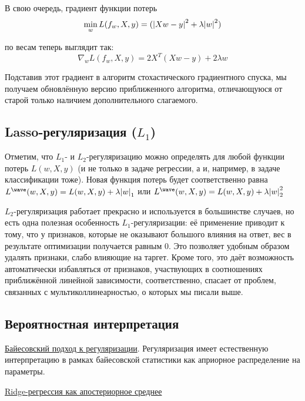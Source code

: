 В свою очередь, градиент функции потерь
\[ \min_w L(f_w,X,y) = (\abs{X w - y }^2 + \lambda \abs{w}^2)\]

по весам теперь выглядит так:
\[ \nabla_w L(f_w,X,y) = 2 X^T (X w - y) + 2 \lambda w \]

Подставив этот градиент в алгоритм стохастического градиентного спуска, мы получаем обновлённую версию приближенного
алгоритма, отличающуюся от старой только наличием дополнительного слагаемого.

\subsection{Lasso-регуляризация ($L_1$)}

Отметим, что $L_1$- и $L_2$-регуляризацию можно определять для любой функции потерь $L(w,X,y)$ (и не только в
задаче регрессии, а и, например, в задаче классификации тоже).
Новая функция потерь будет соответственно равна $L^\wave (w,X,y) = L(w,X,y) + \lambda \abs{w}_1$ или
$L^\wave (w,X,y) = L(w,X,y) + \lambda \abs{w}_2^2$

$L_2$-регуляризация работает прекрасно и используется в большинстве случаев, но есть одна полезная особенность
$L_1$-регуляризации: её применение приводит к тому, что у признаков, которые не оказывают большого влияния на
ответ, вес в результате оптимизации получается равным 0.
Это позволяет удобным образом удалять признаки, слабо влияющие на таргет.
Кроме того, это даёт возможность автоматически избавляться от признаков, участвующих в соотношениях приближённой
линейной зависимости, соответственно, спасает от проблем, связанных с мультиколлинеарностью, о которых мы писали выше.

\subsection{Вероятностная интерпретация}

\underline{Байесовский подход к регуляризации}.
Регуляризация имеет естественную интерпретацию в рамках байесовской статистики как априорное распределение на параметры.

\underline{Ridge-регрессия как апостериорное среднее}

